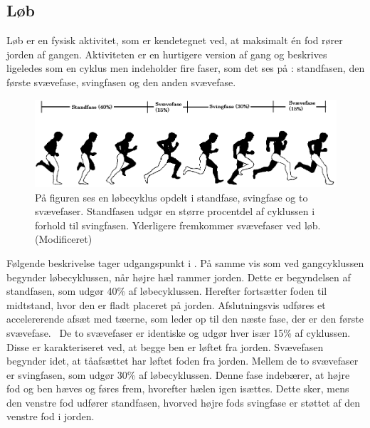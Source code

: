 \subsection{Løb}
Løb er en fysisk aktivitet, som er kendetegnet ved, at maksimalt én fod rører jorden af gangen. Aktiviteten er en hurtigere version af gang og beskrives ligeledes som en cyklus men indeholder fire faser, som det ses på : standfasen, den første svævefase, svingfasen og den anden svævefase. \citep{Adelaar1986,Novacheck1998}
\begin{figure}[H]
	\centering
	\includegraphics[scale=0.65]{figures/bProblemloesning/loeb_cyklus1.png}
	\caption{På figuren ses en løbecyklus opdelt i standfase, svingfase og to svævefaser. Standfasen udgør en større procentdel af cyklussen i forhold til svingfasen. Yderligere fremkommer svævefaser ved løb.~\citep{Adelaar1986} (Modificeret)}
	\label{fig:loebecyklus}
\end{figure}\vspace{-0.25cm}
Følgende beskrivelse tager udgangspunkt i . På samme vis som ved gangcyklussen begynder løbecyklussen, når højre hæl rammer jorden. Dette er begyndelsen af standfasen, som udgør 40\% af løbecyklussen. Herefter fortsætter foden til midtstand, hvor den er fladt placeret på jorden. Afslutningsvis udføres et accelererende afsæt med tæerne, som leder op til den næste fase, der er den første svævefase.~\citep{Adelaar1986,Novacheck1998} \newline 
De to svævefaser er identiske og udgør hver især 15\% af cyklussen. Disse er karakteriseret ved, at begge ben er løftet fra jorden. Svævefasen begynder idet, at tåafsættet har løftet foden fra jorden. Mellem de to svævefaser er svingfasen, som udgør 30\% af løbecyklussen. Denne fase indebærer, at højre fod og ben hæves og føres frem, hvorefter hælen igen isættes. Dette sker, mens den venstre fod udfører standfasen, hvorved højre fods svingfase er støttet af den venstre fod i jorden.~\citep{Adelaar1986,Novacheck1998} %


